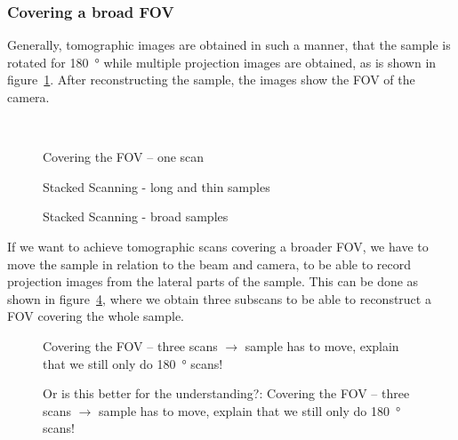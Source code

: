 \subsubsection{Covering a broad FOV}
\label{subsec:covering a broad fov}
Generally, tomographic images are obtained in such a manner, that the sample is rotated for \SI{180}{\degree} while multiple projection images are obtained, as is shown in figure~\ref{fig:covering-one scan}. After reconstructing the sample, the images show the FOV of the camera.

\begin{figure}
	\centering
	\subfloat[\SI{180}{\degree}]{\label{subfig:cover180}}\\
	\subfloat[\SI{360}{\degree}]{\label{subfig:cover360}}
	\caption{Covering the FOV -- one scan}
	\label{fig:covering-one scan}
\end{figure}

\begin{figure}
	\centering
	
	\caption{Stacked Scanning - long and thin samples}
	\label{fig:stacked-scanning}
\end{figure}

\begin{figure}
	\centering
	
	\caption{Stacked Scanning - broad samples}
	\label{fig:widefield-scanning}
\end{figure}

If we want to achieve tomographic scans covering a broader FOV, we have to move the sample in relation to the beam and camera, to be able to record projection images from the lateral parts of the sample. This can be done as shown in figure~\ref{fig:covering-three scans a},  where we obtain three subscans to be able to reconstruct a FOV covering the whole sample.

\begin{figure}
	\centering
	
	\caption{Covering the FOV -- three scans $\rightarrow$ sample has to move, explain that we still only do \SI{180}{\degree} scans!}
	\label{fig:covering-three scans a}
\end{figure}

\begin{figure}
	\centering
	
	\caption{Or is this better for the understanding?: Covering the FOV -- three scans $\rightarrow$ sample has to move, explain that we still only do \SI{180}{\degree} scans!}
	\label{fig:covering-three scans b}
\end{figure}

